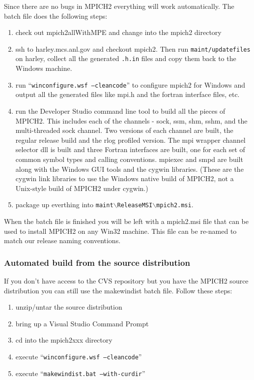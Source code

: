 \documentclass[dvipdfm,11pt]{article}
\begin{document}
Since there are no bugs in MPICH2 everything will work automatically.  The batch file does the
following steps:
\begin{enumerate}
\item check out mpich2allWithMPE and change into the mpich2 directory
\item ssh to harley.mcs.anl.gov and checkout mpich2.  Then run \texttt{maint/updatefiles} on
harley, collect all the generated \texttt{.h.in} files and copy them back to the Windows
machine.
\item run ``\texttt{winconfigure.wsf --cleancode}'' to configure mpich2 for Windows and output
all the generated files like mpi.h and the fortran interface files, etc.
\item run the Developer Studio command line tool to build all the pieces of MPICH2.  This
includes each of the channels - sock, ssm, shm, sshm, and the multi-threaded sock
channel.  Two versions of each channel are built, the regular release build and the rlog
profiled version.  The mpi wrapper channel selector dll is built and three Fortran interfaces
are built, one for each set of common symbol types and calling conventions.  mpiexec and
smpd are built along with the Windows GUI tools and the cygwin libraries.  (These are the cygwin
link libraries to use the Windows native build of MPICH2, not a Unix-style build of MPICH2
under cygwin.)
\item package up everthing into \texttt{maint$\backslash$ReleaseMSI$\backslash$mpich2.msi}.
\end{enumerate}

When the batch file is finished you will be left with a mpich2.msi file that can be used to
install MPICH2 on any Win32 machine.  This file can be re-named to match our release naming 
conventions.

\subsubsection{Automated build from the source distribution}
If you don't have access to the CVS repository but you have the MPICH2 source
distribution you can still use the makewindist batch file.  Follow these steps:
\begin{enumerate}
\item unzip/untar the source distribution
\item bring up a Visual Studio Command Prompt
\item cd into the mpich2xxx directory
\item execute ``\texttt{winconfigure.wsf --cleancode}''
\item execute ``\texttt{makewindist.bat --with-curdir}''
\end{enumerate}
\end{document}

